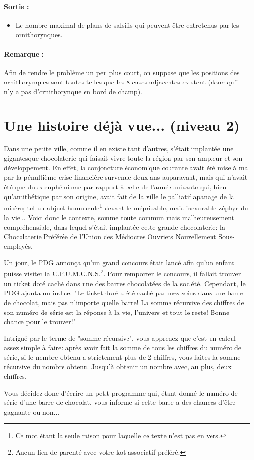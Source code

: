 \documentclass[a4paper]{article}
\begin{document}
\paragraph{Sortie :}
\begin{itemize}
\item Le nombre maximal de plans de salsifis qui peuvent être entretenus par les ornithorynques.
\end{itemize}

\paragraph{Remarque :}
Afin de rendre le problème un peu plus court, on suppose que les positions des ornithorynques sont toutes telles que les 8 cases adjacentes existent (donc qu'il n'y a pas d'ornithorynque en bord de champ).

\section{Une histoire déjà vue... (niveau 2)}
Dans une petite ville, comme il en existe tant d'autres, s'était implantée une gigantesque chocolaterie qui faisait vivre toute la région par son ampleur et son développement. En effet, la conjoncture économique courante avait été mise à mal par la pénultième crise financière survenue deux ans auparavant, mais qui n'avait été que doux euphémisme par rapport à celle de l'année suivante qui, bien qu'antithétique par son origine, avait fait de la ville le palliatif apanage de la misère; tel un abject homoncule\footnote{Ce mot étant la seule raison pour laquelle ce texte n'est pas en vers.} devant le méprisable, mais inexorable zéphyr de la vie... Voici donc le contexte, somme toute commun mais malheureusement compréhensible, dans lequel s'était implantée cette grande chocolaterie: la Chocolaterie Préférée de l'Union des Médiocres Ouvriers Nouvellement Sous-employés.\\
\par Un jour, le PDG annonça qu'un grand concours était lancé afin qu'un enfant puisse visiter la C.P.U.M.O.N.S.\footnote{Aucun lien de parenté avec votre kot-associatif préféré.}. Pour remporter le concours, il fallait trouver un ticket doré caché dans une des barres chocolatées de la société. Cependant, le PDG ajouta un indice: "Le ticket doré a été caché par mes soins dans une barre de chocolat, mais pas n'importe quelle barre! La somme récursive des chiffres de son numéro de série est la réponse à la vie, l'univers et tout le reste! Bonne chance pour le trouver!"
\par Intrigué par le terme de "somme récursive", vous apprenez que c'est un calcul assez simple à faire: après avoir fait la somme de tous les chiffres du numéro de série, si le nombre obtenu a strictement plus de 2 chiffres, vous faites la somme récursive du nombre obtenu. Jusqu'à obtenir un nombre avec, au plus, deux chiffres.
\par Vous décidez donc d'écrire un petit programme qui, étant donné le numéro de série d'une barre de chocolat, vous informe si cette barre a des chances d'être gagnante ou non...
\end{document}
